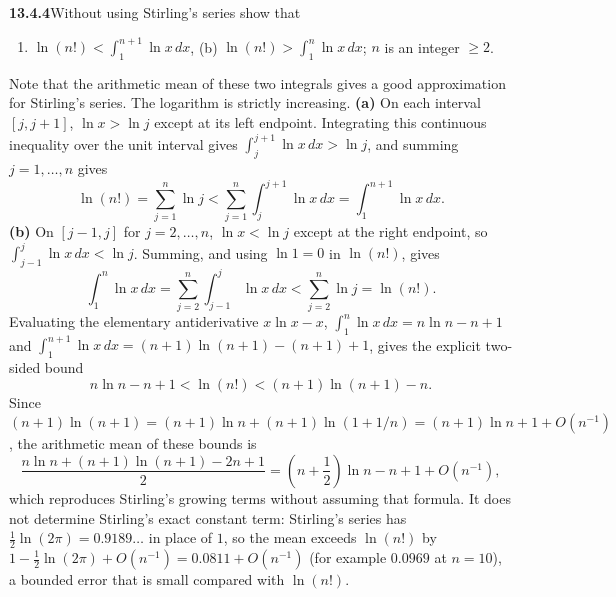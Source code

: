 \par\bigskip
\noindent\textbf{13.4.4}\quad Without using Stirling's series show that
\begin{enumerate}
\item[(a)] $\ln(n!)<\displaystyle\int_{1}^{n+1}\ln x\,dx$,\quad
(b) $\ln(n!)>\displaystyle\int_{1}^{n}\ln x\,dx$; $n$ is an integer $\ge2$.
\end{enumerate}
Note that the arithmetic mean of these two integrals gives a good
approximation for Stirling's series.
\solution
The logarithm is strictly increasing.
\textbf{(a)} On each interval $[j,j+1]$,
$\ln x>\ln j$ except at its left endpoint.  Integrating this
continuous inequality over the unit interval gives
$\int_j^{j+1}\ln x\,dx>\ln j$, and summing $j=1,\ldots,n$ gives
\[
\boxed{\ln(n!)=\sum_{j=1}^n\ln j
<\sum_{j=1}^n\int_j^{j+1}\ln x\,dx
=\int_1^{n+1}\ln x\,dx}.
\]
\textbf{(b)} On $[j-1,j]$ for $j=2,\ldots,n$,
$\ln x<\ln j$ except at the right endpoint, so
$\int_{j-1}^j\ln x\,dx<\ln j$.  Summing, and using $\ln1=0$ in
$\ln(n!)$, gives
\[
\boxed{\int_1^n\ln x\,dx
=\sum_{j=2}^n\int_{j-1}^j\ln x\,dx
<\sum_{j=2}^n\ln j=\ln(n!)}.
\]
Evaluating the elementary antiderivative $x\ln x-x$,
$\int_1^n\ln x\,dx=n\ln n-n+1$ and
$\int_1^{n+1}\ln x\,dx=(n+1)\ln(n+1)-(n+1)+1$, gives the
explicit two-sided bound
\[
n\ln n-n+1<\ln(n!)<(n+1)\ln(n+1)-n.
\]
Since $(n+1)\ln(n+1)=(n+1)\ln n+(n+1)\ln(1+1/n)
=(n+1)\ln n+1+O(n^{-1})$, the arithmetic mean of these bounds is
\[
\frac{n\ln n+(n+1)\ln(n+1)-2n+1}{2}
=\left(n+\frac12\right)\ln n-n+1+O(n^{-1}),
\]
which reproduces Stirling's growing terms without assuming that
formula.  It does not determine Stirling's exact constant term:
Stirling's series has $\frac12\ln(2\pi)=0.9189\ldots$ in place of
$1$, so the mean exceeds $\ln(n!)$ by
$1-\frac12\ln(2\pi)+O(n^{-1})=0.0811+O(n^{-1})$ (for example
$0.0969$ at $n=10$), a bounded error that is small compared with
$\ln(n!)$.


